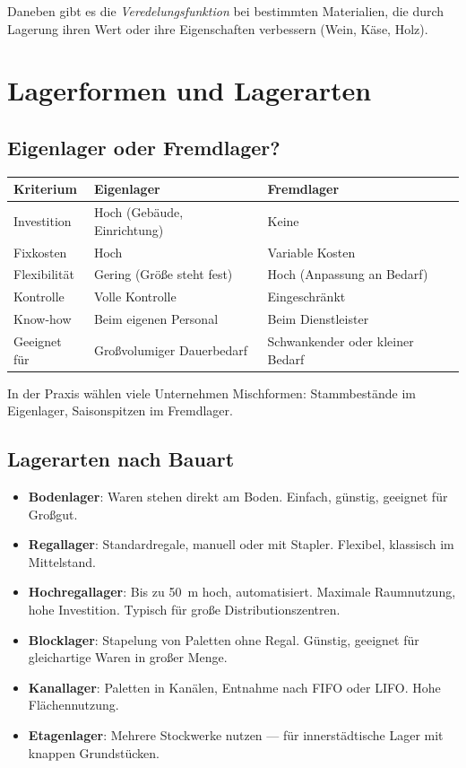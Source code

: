 \documentclass[11pt, a4paper]{article}
\begin{document}
Daneben gibt es die \emph{Veredelungsfunktion} bei bestimmten Materialien, die durch
Lagerung ihren Wert oder ihre Eigenschaften verbessern (Wein, Käse, Holz).

\section{Lagerformen und Lagerarten}

\subsection{Eigenlager oder Fremdlager?}

\begin{center}
\begin{tabular}{p{4cm} p{5cm} p{5cm}}
\toprule
\textbf{Kriterium} & \textbf{Eigenlager} & \textbf{Fremdlager}\\
\midrule
Investition & Hoch (Gebäude, Einrichtung) & Keine\\
Fixkosten & Hoch & Variable Kosten\\
Flexibilität & Gering (Größe steht fest) & Hoch (Anpassung an Bedarf)\\
Kontrolle & Volle Kontrolle & Eingeschränkt\\
Know-how & Beim eigenen Personal & Beim Dienstleister\\
Geeignet für & Großvolumiger Dauerbedarf & Schwankender oder kleiner Bedarf\\
\bottomrule
\end{tabular}
\end{center}

In der Praxis wählen viele Unternehmen Mischformen: Stammbestände im Eigenlager,
Saisonspitzen im Fremdlager.

\subsection{Lagerarten nach Bauart}

\begin{itemize}[itemsep=0pt]
  \item \textbf{Bodenlager}: Waren stehen direkt am Boden. Einfach, günstig, geeignet für Großgut.
  \item \textbf{Regallager}: Standardregale, manuell oder mit Stapler. Flexibel, klassisch im Mittelstand.
  \item \textbf{Hochregallager}: Bis zu 50~m hoch, automatisiert. Maximale Raumnutzung, hohe Investition. Typisch für große Distributionszentren.
  \item \textbf{Blocklager}: Stapelung von Paletten ohne Regal. Günstig, geeignet für gleichartige Waren in großer Menge.
  \item \textbf{Kanallager}: Paletten in Kanälen, Entnahme nach FIFO oder LIFO. Hohe Flächennutzung.
  \item \textbf{Etagenlager}: Mehrere Stockwerke nutzen --- für innerstädtische Lager mit knappen Grundstücken.
\end{itemize}
\end{document}
